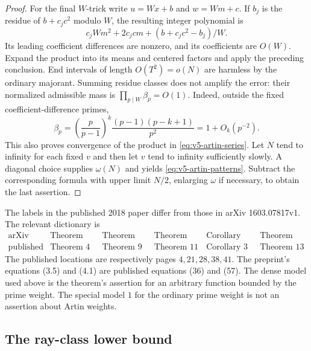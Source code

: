 \begin{proof}
For the final $W$-trick write $u=Wx+b$ and $w=Wm+c$.
If $b_j$ is the residue of $b+c_jc^2$ modulo $W$, the resulting integer
polynomial is
\[
 c_jWm^2+2c_jcm+(b+c_jc^2-b_j)/W.
\]
Its leading coefficient differences are nonzero, and its coefficients
are $O(W)$. Expand the product into its means and centered factors and
apply the preceding conclusion. End intervals of length $O(T^2)=o(N)$
are harmless by the ordinary majorant. Summing residue classes does not
amplify the error: their normalized admissible mass is
$\prod_{p\mid W}\beta_p=O(1)$.
Indeed, outside the fixed coefficient-difference primes,
\[
 \beta_p=\left(\frac p{p-1}\right)^k
                \frac{(p-1)(p-k+1)}{p^2}=1+O_k(p^{-2}).
\]
This also proves convergence of the product in
\eqref{eq:v5-artin-series}.
Let $N$ tend to infinity for each fixed $v$ and then let $v$ tend to
infinity sufficiently slowly. A diagonal choice supplies $\omega(N)$
and yields \eqref{eq:v5-artin-patterns}. Subtract the corresponding
formula with upper limit $N/2$, enlarging $\omega$ if necessary, to
obtain the last assertion.
\end{proof}

\begin{remark}\label{rem:v5-tz-numbering}
The labels in the published 2018 paper differ from those in arXiv
1603.07817v1. The relevant dictionary is
\[
\begin{array}{c|ccccc}
 \text{arXiv} &\text{Theorem 1.4}&\text{Theorem 2.5}&\text{Theorem 3.1}
               &\text{Corollary 3.9}&\text{Theorem 4.1}\\
 \text{published}&\text{Theorem 4}&\text{Theorem 9}&\text{Theorem 11}
               &\text{Corollary 3}&\text{Theorem 13}
\end{array}
\]
The published locations are respectively pages $4,21,28,38,41$.
The preprint's equations (3.5) and (4.1) are published equations (36)
and (57). The dense model used above is the theorem's assertion for an
arbitrary function bounded by the prime weight. The special model $1$
for the ordinary prime weight is not an assertion about Artin weights.
\end{remark}

\subsection{The ray-class lower bound}\label{subsec:v5-ray-density}

